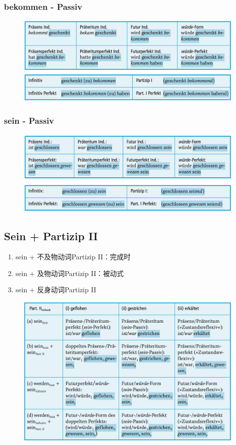 \documentclass[UTF8]{report}
\begin{document}
\subsubsection{bekommen - Passiv}
\begin{figure}[H]
    \centering
    \includegraphics[scale=0.5]{bkp.png}
\end{figure}
\subsubsection{sein - Passiv}
\begin{figure}[H]
    \centering
    \includegraphics[scale=0.5]{sp.png}
\end{figure}

\subsection{Sein + Partizip II}
\begin{enumerate}
    \item sein + 不及物动词Partizip II：完成时
    \item sein + 及物动词Partizip II：被动式
    \item sein + 反身动词Partizip II
\end{enumerate}
\begin{figure}[H]
    \centering
    \includegraphics[scale=0.5]{sp2.png}
\end{figure}
\end{document}
